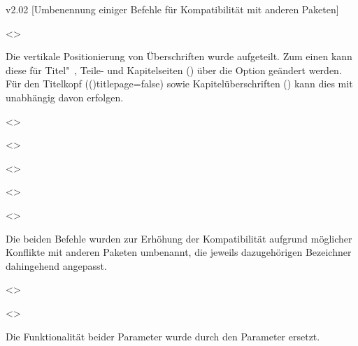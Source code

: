 \begin{Cessations}{v2.02}
  [Umbenennung einiger Befehle für Kompatibilität mit anderen Paketen]
\begin{Cessation}
  {}
  <>
\printdeclarationlist

Die vertikale Positionierung von Überschriften wurde aufgeteilt. Zum einen kann 
diese für Titel"~, Teile- und Kapitelseiten () über 
die Option  geändert werden. Für den Titelkopf
(\Option*(){titlepage=false}) sowie Kapitelüberschriften 
() kann dies mit  
unabhängig davon erfolgen.
\end{Cessation}

\begin{Cessation}
  {}
  <>
\begin{Cessation}
  {}
  <>
\begin{Cessation}
  {}
  <>
\begin{Cessation}
  {}
  <>
\begin{Cessation}
  {}
  <>
\printdeclarationlist

Die beiden Befehle wurden zur Erhöhung der Kompatibilität aufgrund möglicher 
Konflikte mit anderen Paketen umbenannt, die jeweils dazugehörigen Bezeichner 
dahingehend angepasst.
\end{Cessation}
\end{Cessation}
\end{Cessation}
\end{Cessation}
\end{Cessation}

\begin{Declaration*}
  {}
\begin{Cessation}
  {}
  <>
\begin{Cessation}
  {}
  <>
\printdeclarationlist

Die Funktionalität beider Parameter wurde durch den Parameter 
 ersetzt.
\end{Cessation}
\end{Cessation}
\end{Declaration*}



\end{Cessations}
